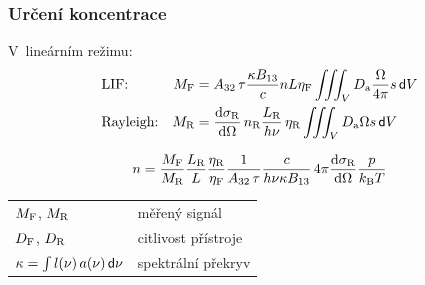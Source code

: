 \documentclass[10pt]{beamer}
\renewcommand\dd[1]{\,\mathsf{d}#1}
\begin{document}
\begin{frame}
	\frametitle{Určení koncentrace}
	V~lineárním režimu:
	\begin{align*}
		&\text{LIF:} &
		\lifsignal &= \einsteina32\,\lifetime
		\frac{\specoverlap \einsteinb13}{\lightspeed}
		\ndens \enlaser \lifeff
		\iiint_\vol \sensabs \frac{\solidangle}{4\pi} \beamprofile \dd{\vol} \\
		&\text{Rayleigh:} &
		\rayleighsignal &= \rayleighdxsect \, \rayleighndens
		\frac{\enlaserrayleigh}{\planck\freq} \, \rayleigheff
		\iiint_\vol \sensabs \solidangle \beamprofile \dd{\vol}
	\end{align*}
	\vspace{-3ex}
	\begin{block}{\vspace*{-2ex}}
		\begin{equation*}
			n = \frac{M_\text{F}}{M_\text{R}}
			\frac{L_\text{R}}{L}\frac{\eta_\text{R}}{\eta_\text{F}}
			\frac{1}{A_{32}\,\tau}
			\frac{c}{h\nu\kappa B_{13}}
			\, 4\pi \frac{\text{d}\sigma_\text{R}}{\text{d}\Omega} \frac{p}{k_\text{B}T}
		\end{equation*}
	\end{block}
	\medskip
	\begin{tabular}{l l}
		$M_\text{F}$, $M_\text{R}$ & měřený signál \\
		$D_\text{F}$, $D_\text{R}$ & citlivost přístroje \\
		$\specoverlap = \int l(\freq)\,a(\freq) \dd{\freq}$
		& spektrální překryv
	\end{tabular}
\end{frame}
\end{document}
